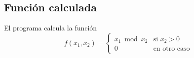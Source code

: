 	\subsection{Función calculada}
	El programa calcula la función
	\begin{equation*}
		f(x_1, x_2)= \left\{ 
  		\begin{array}{rl}
  				x_1 \bmod x_2 & \text{si } x_2>0 \\
  				0 & \text{en otro caso} 
  		\end{array} \right.
	\end{equation*}

